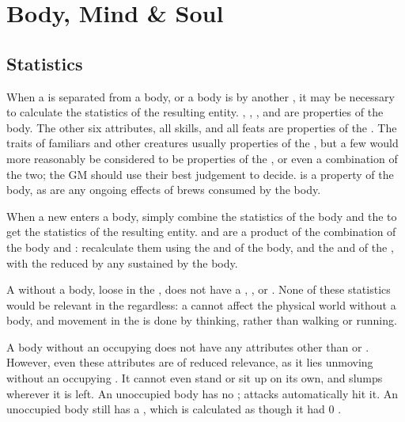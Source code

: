 \chapter{Body, Mind \& Soul}

\section{Statistics}

When a {\mind} is separated from a body, or a body is {\possessed} by another {\mind}, it may be necessary to calculate the statistics of the resulting entity.
, , , and  are properties of the body.
The other six attributes, all skills, and all feats are properties of the {\mind}.
The traits of familiars and other creatures usually properties of the {\body}, but a few would more reasonably be considered to be properties of the {\mind}, or even a combination of the two; the GM should use their best judgement to decide.
\capital{\damage} is a property of the body, as are any ongoing effects of brews consumed by the body.

When a new {\mind} enters a body, simply combine the statistics of the body and the {\mind} to get the statistics of the resulting entity.
 and  are a product of the combination of the body and {\mind}: recalculate them using the  and  of the body, and the  and  of the {\mind}, with the  reduced by any {\damage} sustained by the body.

A {\mind} without a body, loose in the {\mentalrealm}, does not have a , , or .
None of these statistics would be relevant in the {\mentalrealm} regardless: a {\mind} cannot affect the physical world without a body, and movement in the {\mentalrealm} is done by thinking, rather than walking or running.

A body without an occupying {\mind} does not have any attributes other than  or .
However, even these attributes are of reduced relevance, as it lies unmoving without an occupying {\mind}.
It cannot even stand or sit up on its own, and slumps wherever it is left.
An unoccupied body has no ; attacks automatically hit it.
An unoccupied body still has a , which is calculated as though it had 0 .
